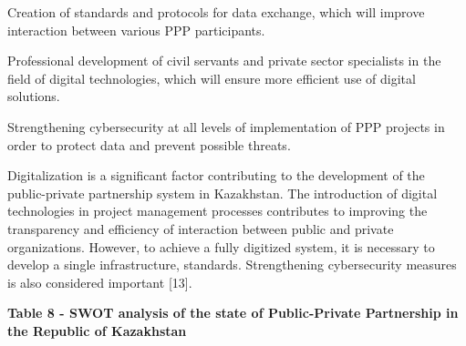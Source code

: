 Creation of standards and protocols for data exchange, which will
improve interaction between various PPP participants.

Professional development of civil servants and private sector
specialists in the field of digital technologies, which will ensure more
efficient use of digital solutions.

Strengthening cybersecurity at all levels of implementation of PPP
projects in order to protect data and prevent possible threats.

Digitalization is a significant factor contributing to the development
of the public-private partnership system in Kazakhstan. The introduction
of digital technologies in project management processes contributes to
improving the transparency and efficiency of interaction between public
and private organizations. However, to achieve a fully digitized system,
it is necessary to develop a single infrastructure, standards.
Strengthening cybersecurity measures is also considered important
{[}13{]}.

{\bfseries Table 8 - SWOT analysis of the state of Public-Private
Partnership in the Republic of Kazakhstan}

